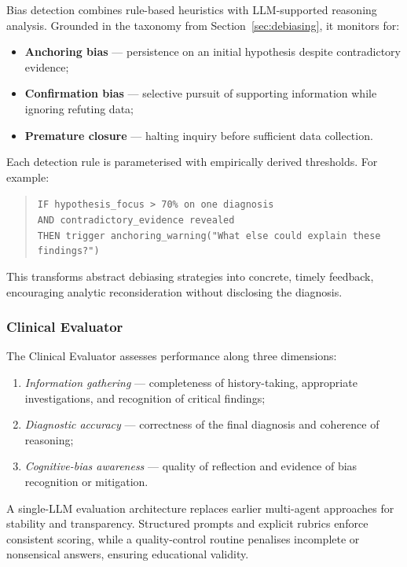 Bias detection combines rule-based heuristics with LLM-supported reasoning
analysis.
Grounded in the taxonomy from Section~\ref{sec:debiasing}, it monitors for:

\begin{itemize}
  \item \textbf{Anchoring bias} — persistence on an initial hypothesis despite
  contradictory evidence;
  \item \textbf{Confirmation bias} — selective pursuit of supporting information
  while ignoring refuting data;
  \item \textbf{Premature closure} — halting inquiry before sufficient data
  collection.
\end{itemize}

Each detection rule is parameterised with empirically derived thresholds.
For example:

\begin{quote}
\texttt{IF hypothesis\_focus > 70\% on one diagnosis}\\
\texttt{AND contradictory\_evidence revealed}\\
\texttt{THEN trigger anchoring\_warning("What else could explain these findings?")}
\end{quote}

This transforms abstract debiasing strategies into concrete, timely feedback,
encouraging analytic reconsideration without disclosing the diagnosis.

\subsubsection{Clinical Evaluator}

The Clinical Evaluator assesses performance along three dimensions:

\begin{enumerate}
  \item \textit{Information gathering} — completeness of history-taking,
  appropriate investigations, and recognition of critical findings;
  \item \textit{Diagnostic accuracy} — correctness of the final diagnosis and
  coherence of reasoning;
  \item \textit{Cognitive-bias awareness} — quality of reflection and evidence
  of bias recognition or mitigation.
\end{enumerate}

A single-LLM evaluation architecture replaces earlier multi-agent approaches for
stability and transparency.
Structured prompts and explicit rubrics enforce consistent scoring, while a
quality-control routine penalises incomplete or nonsensical answers, ensuring
educational validity.

